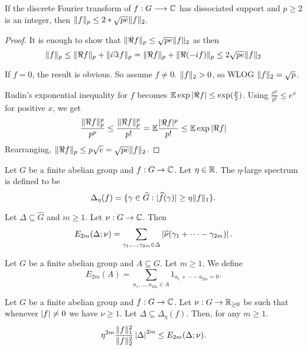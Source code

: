 \begin{lemma}
\label{rudin}
\leanok
If the discrete Fourier transform of $f : G \longrightarrow \mathbb{C}$ has dissociated support and $p \ge 2$ is an integer, then $\lVert f\rVert_p \le 2 * \sqrt{pe} \lVert f\rVert_2$.
\end{lemma}
\begin{proof}
\leanok
It is enough to show that $\lVert \Re f\rVert_p \le \sqrt{pe} \lVert f\rVert_2$ as then
$$\lVert f\rVert_p \le \lVert \Re f\rVert_p + \lVert i \Im f\rVert_p = \lVert \Re f\rVert_p + \lVert \Re (-if)\rVert_p \le 2 \sqrt{pe} \lVert f\rVert_2$$

If $f = 0$, the result is obvious. So assume $f \ne 0$. $\lVert f\rVert_2 > 0$, so WLOG $\lVert f\rVert_2 = \sqrt p$.

Rudin's exponential inequality for $f$ becomes $\mathbb{E} \exp|\Re f| \le \exp(\frac p 2)$. Using $\frac{x^p}{p!} \le e^x$ for positive $x$, we get
$$\frac{\lVert \Re f\rVert_p^p}{p^p} \le \frac{\lVert \Re f\rVert_p^p}{p!} = \mathbb{E} \frac{|\Re f|^p}{p!} \le \mathbb{E} \exp|\Re f|$$
Rearranging, $\lVert \Re f\rVert_p \le p\sqrt{e} = \sqrt{pe} \lVert f\rVert_2$.
\end{proof}


\begin{definition}
\label{large_spec}
\leanok
Let $G$ be a finite abelian group and $f:G\to\mathbb{C}$. Let $\eta\in \mathbb{R}$. The $\eta$-large spectrum is defined to be
\[\Delta_\eta(f) = \{ \gamma\in\widehat{G} : \lvert \widehat{f}(\gamma)\rvert \geq \eta\lVert f\rVert_1\}.\]
\end{definition}


\begin{definition}
\label{weight_energy}
\leanok
Let $\Delta\subseteq \widehat{G}$ and $m\geq 1$. Let $\nu:G\to \mathbb{C}$. Then
\[E_{2m}(\Delta;\nu)=\sum_{\gamma_1,\ldots,\gamma_{2m}\in \Delta}\left\lvert \widehat{\nu}(\gamma_1+\cdots-\gamma_{2m})\right\rvert.\]
\end{definition}


\begin{definition}[Energy]
\label{energy}
\leanok
Let $G$ be a finite abelian group and $A\subseteq G$. Let $m\geq 1$. We define
\[E_{2m}(A)=\sum_{a_1,\ldots,a_{2m}\in A}1_{a_1+\cdots-a_{2m}=0}.\]
\end{definition}


\begin{lemma}
\label{general_hoelder}
\leanok
Let $G$ be a finite abelian group and $f:G\to\mathbb{C}$. Let $\nu:G\to \mathbb{R}_{\geq 0}$ be such that whenever $\left\lvert f\right\rvert\neq 0$ we have $\nu \geq 1$. Let $\Delta\subseteq \Delta_\eta(f)$. Then, for any $m\geq 1$.
\[\eta^{2m}\frac{\lVert f\rVert_1^2}{\lVert f\rVert_2^2}\left\lvert \Delta\right\rvert^{2m}\leq E_{2m}(\Delta;\nu).\]
\end{lemma}

